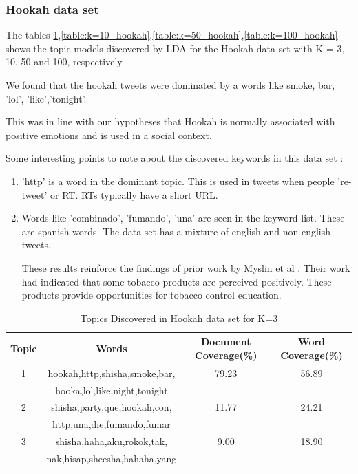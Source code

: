 \documentclass[11pt,a4paper,oneside]{article}
\begin{document}
\subsubsection{Hookah data set}
The tables \ref{table:k=3_hookah},\ref{table:k=10_hookah},\ref{table:k=50_hookah},\ref{table:k=100_hookah} shows the topic models discovered by LDA for the Hookah data set with K = 3, 10, 50 and 100, respectively. 

We found that the hookah tweets were dominated by a words like smoke, bar, 'lol', 'like','tonight'.

This was in line with our hypotheses that Hookah is normally associated with positive emotions and is used in a social context. 

Some interesting points to note about the discovered keywords in this data set :
\begin{enumerate}
\item 'http' is a word in the dominant topic. This is used in tweets when people 're-tweet' or RT. RTs typically have a short URL.
\item Words like 'combinado', 'fumando', 'una' are seen in the keyword list. These are spanish words. The data set has a mixture of english and non-english tweets.

These results reinforce the findings of prior work by Myslin et al \cite{JMIR}. Their work had indicated that some tobacco products are perceived positively. These products provide opportunities for tobacco control education.

\end{enumerate}

\begin{table}
\begin{tabular}{|c|c|c|c|}
\hline 
Topic & Words & Document Coverage(\%) & Word Coverage(\%) \\ 
\hline 
1 & hookah,http,shisha,smoke,bar, & 79.23 & 56.89 \\ 
& hooka,lol,like,night,tonight & & \\
\hline 
2 & shisha,party,que,hookah,con, & 11.77 & 24.21 \\ 
& http,una,die,fumando,fumar & & \\
\hline 
3 & shisha,haha,aku,rokok,tak, & 9.00 & 18.90 \\ 
& nak,hisap,sheesha,hahaha,yang & & \\
\hline 
\end{tabular}
\caption{Topics Discovered in Hookah data set for K=3}
\label{table:k=3_hookah}
\end{table}
\end{document}
